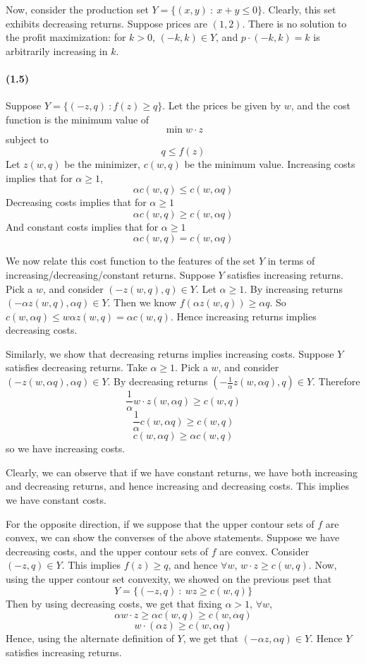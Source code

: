 \documentclass[10pt,letter]{article}
\begin{document}
Now, consider the production set $Y = \{(x,y) \ : \ x + y \le 0 \}$. Clearly, this set exhibits decreasing returns. Suppose prices are $(1, 2)$. There is no solution to the profit maximization: for $k > 0$, $(-k, k) \in Y$, and $p \cdot (-k, k) = k$ is arbitrarily increasing in $k$.
\paragraph{(1.5)}
Suppose $Y = \{ (-z, q) \ : f(z) \ge q \} $. Let the prices be given by $w$, and the cost function is the minimum value of
\[ \min w \cdot z \]
subject to
\[ q \le f(z) \]
Let $z(w,q)$ be the minimizer, $c(w,q)$ be the minimum value.
Increasing costs implies that for $\alpha \ge 1$,
\[ \alpha c(w, q) \le  c(w,\alpha q) \]
Decreasing costs implies that for $\alpha \ge 1$
\[ \alpha c(w, q) \ge  c(w,\alpha q) \]
And constant costs implies that for $\alpha \ge 1$
\[ \alpha c(w, q) =  c(w,\alpha q) \]

We now relate this cost function to the features of the set $Y$ in terms of increasing/decreasing/constant returns.
Suppose $Y$ satisfies increasing returns. Pick a $w$, and consider $(-z(w,q), q) \in Y$. Let $\alpha \ge 1$. By increasing returns $(-\alpha z(w,q), \alpha q) \in Y$. Then we know $f(\alpha z(w,q)) \ge \alpha q$. So $c(w, \alpha q) \le w \alpha z(w,q) = \alpha c(w,q)$. Hence increasing returns implies decreasing costs.

Similarly, we show that decreasing returns implies increasing costs. Suppose $Y$ satisfies decreasing returns. Take $\alpha \ge 1$. Pick a $w$, and consider $(-z(w,\alpha q), \alpha q) \in Y$. By decreasing returns $(-\frac{1}{\alpha}z(w,\alpha q), q) \in Y$. Therefore
\[ \frac{1}{\alpha} w \cdot z(w, \alpha q) \ge c(w, q) \]
\[ \frac{1}{\alpha} c(w, \alpha q) \ge c(w, q) \]
\[ c(w, \alpha q) \ge \alpha c(w, q) \]
so we have increasing costs.

Clearly, we can observe that if we have constant returns, we have both increasing and decreasing returns, and hence increasing and decreasing costs. This implies we have constant costs.

For the opposite direction, if we suppose that the upper contour sets of $f$ are convex, we can show the converses of the above statements. Suppose we have decreasing costs, and the upper contour sets of $f$ are convex. Consider $(-z, q) \in Y$. This implies $f(z) \ge q$, and hence $\forall w$, $w \cdot z \ge c(w, q)$. Now, using the upper contour set convexity, we showed on the previous pset that
\[ Y = \{ (-z, q) \ : \ wz \ge c(w,q) \}  \]
Then by using decreasing costs, we get that fixing $\alpha > 1$, $\forall w$,
\[ \alpha w \cdot z \ge \alpha c(w,q)\ge c(w, \alpha q) \]
\[ w \cdot (\alpha z) \ge c(w, \alpha q) \]
Hence, using the alternate definition of $Y$, we get that $(-\alpha z, \alpha q) \in Y$. Hence $Y$ satisfies increasing returns.
\end{document}
